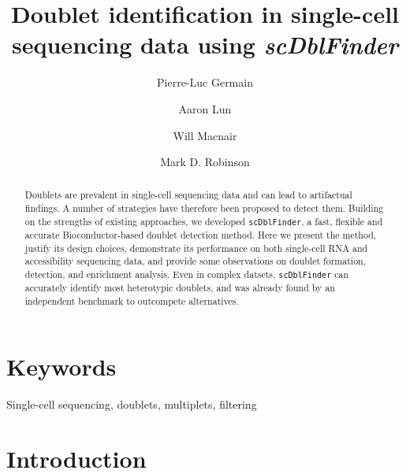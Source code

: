 \documentclass[10pt,a4paper,twocolumn]{article}
\begin{document}
\title{Doublet identification in single-cell sequencing data using \textit{scDblFinder}}
\author[1]{Pierre-Luc Germain}
\author[2]{Aaron Lun}
\author[3]{Will Macnair}
\author[4]{Mark D. Robinson}

\maketitle
\thispagestyle{fancy}


\begin{abstract}

Doublets are prevalent in single-cell sequencing data and can lead to artifactual findings.
A number of strategies have therefore been proposed to detect them.
Building on the strengths of existing approaches, we developed \texttt{scDblFinder},
a fast, flexible and accurate Bioconductor-based doublet detection method.
Here we present the method, justify its design choices, demonstrate its performance on both single-cell RNA and
accessibility sequencing data, and provide some observations on doublet formation, detection, and enrichment analysis.
Even in complex datsets, \texttt{scDblFinder} can accurately identify most heterotypic doublets,
and was already found by an independent benchmark to outcompete alternatives.


\end{abstract}

\section*{Keywords}

Single-cell sequencing, doublets, multiplets, filtering

\clearpage

\section*{Introduction}
\end{document}
